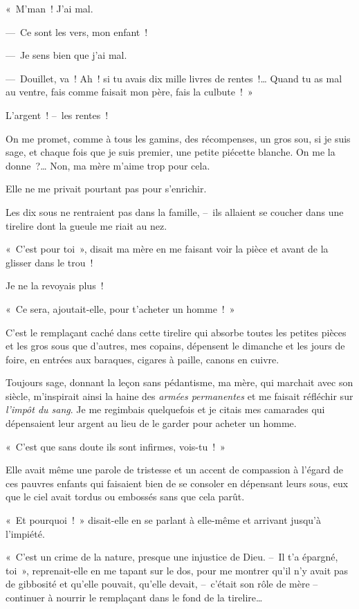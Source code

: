 \documentclass[french,twoside]{book} %
\begin{document}
\noindent « M’man ! J’ai mal.\par
— Ce sont les vers, mon enfant !\par
— Je sens bien que j’ai mal.\par
— Douillet, va ! Ah ! si tu avais dix mille livres de rentes !… Quand tu as mal au ventre, fais comme faisait mon père, fais la culbute ! »\par
\bigbreak
\noindent L’argent ! – les rentes !\par
On me promet, comme à tous les gamins, des récompenses, un gros sou, si je suis sage, et chaque fois que je suis premier, une petite piécette blanche. On me la donne ?… Non, ma mère m’aime trop pour cela.\par
Elle ne me privait pourtant pas pour s’enrichir.\par
Les dix sous ne rentraient pas dans la famille, – ils allaient se coucher dans une tirelire dont la gueule me riait au nez.\par
« C’est pour toi », disait ma mère en me faisant voir la pièce et avant de la glisser dans le trou !\par
Je ne la revoyais plus !\par
« Ce sera, ajoutait-elle, pour t’acheter un homme ! »\par
C’est le remplaçant caché dans cette tirelire qui absorbe toutes les petites pièces et les gros sous que d’autres, mes copains, dépensent le dimanche et les jours de foire, en entrées aux baraques, cigares à paille, canons en cuivre.\par
Toujours sage, donnant la leçon sans pédantisme, ma mère, qui marchait avec son siècle, m’inspirait ainsi la haine des \emph{armées permanentes} et me faisait réfléchir sur \emph{l’impôt du sang}. Je me regimbais quelquefois et je citais mes camarades qui dépensaient leur argent au lieu de le garder pour acheter un homme.\par
\bigbreak
\noindent « C’est que sans doute ils sont infirmes, vois-tu ! »\par
Elle avait même une parole de tristesse et un accent de compassion à l’égard de ces pauvres enfants qui faisaient bien de se consoler en dépensant leurs sous, eux que le ciel avait tordus ou embossés sans que cela parût.\par
« Et pourquoi ! » disait-elle en se parlant à elle-même et arrivant jusqu’à l’impiété.\par
« C’est un crime de la nature, presque une injustice de Dieu. – Il t’a épargné, toi », reprenait-elle en me tapant sur le dos, pour me montrer qu’il n’y avait pas de gibbosité et qu’elle pouvait, qu’elle devait, – c’était son rôle de mère – continuer à nourrir le remplaçant dans le fond de la tirelire…\par
\end{document}

